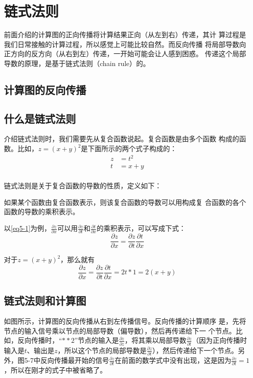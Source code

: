 \section{链式法则}
前面介绍的计算图的正向传播将计算结果正向（从左到右）传递，其计
算过程是我们日常接触的计算过程，所以感觉上可能比较自然。而反向传播
将局部导数向正方向的反方向（从右到左）传递，一开始可能会让人感到困惑。
传递这个局部导数的原理，是基于链式法则（chain rule）的。
\subsection{计算图的反向传播}

\subsection{什么是链式法则}
介绍链式法则时，我们需要先从复合函数说起。复合函数是由多个函数
构成的函数。比如，$z = (x + y)^2$是下面所示的两个式子构成的：
\begin{equation}
    \label{eq5-1}
    \begin{aligned}
        z & =t^2 \\
        t & =x+y \\
    \end{aligned}
\end{equation}

链式法则是关于复合函数的导数的性质，定义如下：
\begin{tcolorbox}
    如果某个函数由复合函数表示，则该复合函数的导数可以用构成复
    合函数的各个函数的导数的乘积表示。
\end{tcolorbox}

以\autoref{eq5-1}为例，$\frac{\partial z}{\partial x}$可以用$\frac{\partial z}{\partial t}$和$\frac{\partial t}{\partial x}$的乘积表示，可以写成下式：
\begin{equation}
    \frac{\partial z}{\partial x}=\frac{\partial z}{\partial t}\frac{\partial t}{\partial x}
\end{equation}

对于$z = (x + y)^2$，那么就有
\begin{equation*}
    \frac{\partial z}{\partial x}=\frac{\partial z}{\partial t}\frac{\partial t}{\partial x}=2t*1=2(x+y)
\end{equation*}
\subsection{链式法则和计算图}
如图所示，计算图的反向传播从右到左传播信号。反向传播的计算顺序
是，先将节点的输入信号乘以节点的局部导数（偏导数），然后再传递给下一
个节点。比如，反向传播时，“$**2$”节点的输入是$\frac{\partial z}{\partial z}$，将其乘以局部导数$\frac{\partial z}{\partial t}$（因为正向传播时输入是$t$、输出是$z$，所以这个节点的局部导数是$\frac{\partial z}{\partial t}$），然后传递给下一个节点。另外，图5-7中反向传播最开始的信号$\frac{\partial z}{\partial t}$在前面的数学式中没有出现，这是因为$\frac{\partial z}{\partial t}=1$，所以在刚才的式子中被省略了。